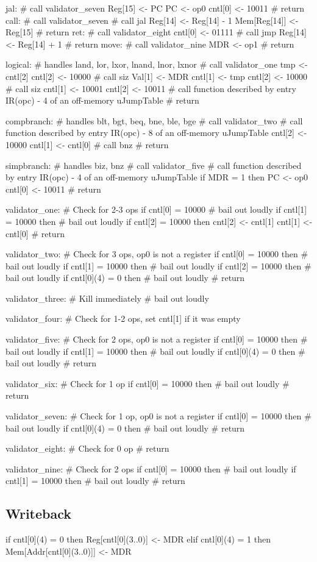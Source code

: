 \documentclass[12pt]{article}
\begin{document}
\begin{verbatimtab}
jal:
    # call validator_seven
    Reg[15] <- PC    
    PC <- op0
    cntl[0] <- 10011
    # return
call:
	# call validator_seven
	# call jal
	Reg[14] <- Reg[14] - 1
	Mem[Reg[14]] <- Reg[15]
	# return
ret:
	# call validator_eight
	cntl[0] <- 01111
	# call jmp
	Reg[14] <- Reg[14] + 1
	# return
move:
    # call validator_nine
    MDR <- op1
    # return

logical: # handles land, lor, lxor, lnand, lnor, lxnor
	# call validator_one
	tmp <- cntl[2]
	cntl[2] <- 10000
	# call siz
	Val[1] <- MDR
	cntl[1] <- tmp
	cntl[2] <- 10000
	# call siz
	cntl[1] <- 10001
	cntl[2] <- 10011
	# call function described by entry IR(opc) - 4 of an off-memory uJumpTable
	# return

compbranch: # handles blt, bgt, beq, bne, ble, bge
	# call validator_two
	# call function described by entry IR(opc) - 8 of an off-memory uJumpTable
	cntl[2] <- 10000
	cntl[1] <- cntl[0]
	# call bnz
	# return

simpbranch: # handles biz, bnz
	# call validator_five
	# call function described by entry IR(opc) - 4 of an off-memory uJumpTable
	if MDR = 1 then
		PC <- op0
	cntl[0] <- 10011
	# return

validator_one:
	# Check for 2-3 ops
	if cntl[0] = 10000
		# bail out loudly
	if cntl[1] = 10000 then
		# bail out loudly
	if cntl[2] = 10000 then
		cntl[2] <- cntl[1]
		cntl[1] <- cntl[0]
	# return

validator_two:
	# Check for 3 ops, op0 is not a register
	if cntl[0] = 10000 then
		# bail out loudly
	if cntl[1] = 10000 then
		# bail out loudly
	if cntl[2] = 10000 then
		# bail out loudly
	if cntl[0](4) = 0 then
		# bail out loudly
	# return

validator_three:
	# Kill immediately
	# bail out loudly

validator_four:
	# Check for 1-2 ops, set cntl[1] if it was empty

validator_five:
	# Check for 2 ops, op0 is not a register
	if cntl[0] = 10000 then
		# bail out loudly
	if cntl[1] = 10000 then
		# bail out loudly
	if cntl[0](4) = 0 then
		# bail out loudly
	# return

validator_six:
	# Check for 1 op
	if cntl[0] = 10000 then
		# bail out loudly
	# return

validator_seven:
	# Check for 1 op, op0 is not a register
	if cntl[0] = 10000 then
		# bail out loudly
	if cntl[0](4) = 0 then
		# bail out loudly
	# return

validator_eight:
	# Check for 0 op
	# return

validator_nine:
	# Check for 2 ops
    if cntl[0] = 10000 then
        # bail out loudly
    if cntl[1] = 10000 then
        # bail out loudly
    # return
\end{verbatimtab}

\subsection{Writeback}
\begin{verbatimtab}
if cntl[0](4) = 0 then
   Reg[cntl[0](3..0)] <- MDR
elif cntl[0](4) = 1 then
   Mem[Addr[cntl[0](3..0)]] <- MDR
\end{verbatimtab}
\end{document}
